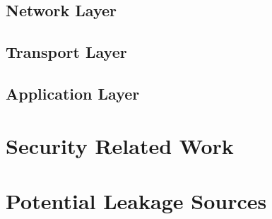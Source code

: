\subsection{Network Layer}

\subsection{Transport Layer}

\subsection{Application Layer}

%
%

\section{Security Related Work}

\section{Potential Leakage Sources}